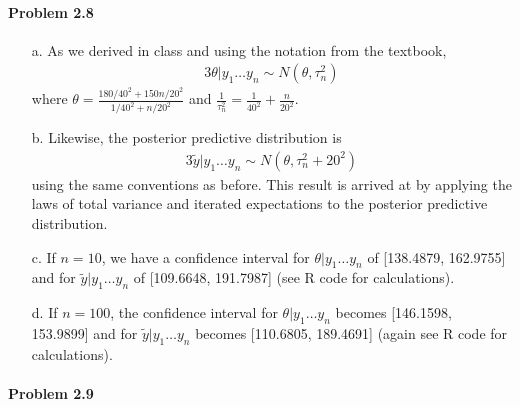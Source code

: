 \documentclass[10pt]{article}
\begin{document}
\paragraph{Problem 2.8}

\begin{enumerate}
\item[a.] As we derived in class and using the notation from the textbook,
\begin{alignat*}{3}
\theta | y_1 \ldots y_n \sim N(\theta, \tau_n^2)
\end{alignat*}
where $\theta=\frac{180/40^2+150n/20^2}{1/40^2+n/20^2}$ and $\frac{1}{\tau_n^2}=\frac{1}{40^2}+\frac{n}{20^2}$.

\item[b.] Likewise, the posterior predictive distribution is
\begin{alignat*}{3}
\tilde{y} | y_1 \ldots y_n \sim N(\theta, \tau_n^2 + 20^2)
\end{alignat*}
using the same conventions as before. This result is arrived at by applying the laws of total variance and iterated expectations to the posterior predictive distribution.

\item[c.] If $n=10$, we have a confidence interval for $\theta | y_1 \ldots y_n$ of [138.4879, 162.9755] and for $\tilde{y} | y_1 \ldots y_n$ of [109.6648, 191.7987] (see R code for calculations).

\item[d.] If $n=100$, the confidence interval for $\theta | y_1 \ldots y_n$ becomes [146.1598, 153.9899] and for $\tilde{y} | y_1 \ldots y_n$ becomes [110.6805, 189.4691] (again see R code for calculations).

\end{enumerate}

\paragraph{Problem 2.9}
\end{document}
